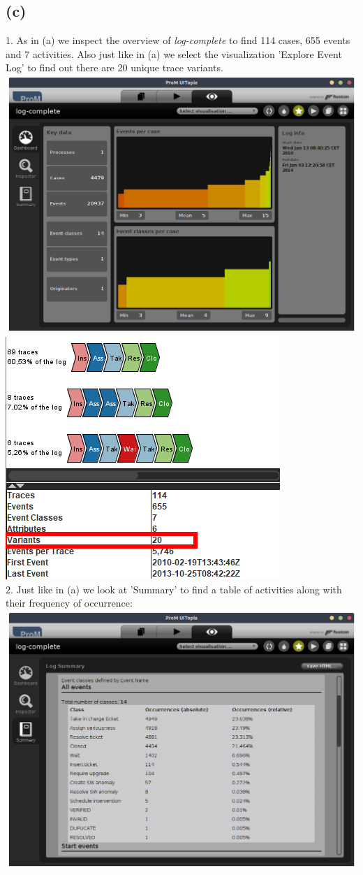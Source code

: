 \documentclass[../../main.tex]{subfiles}
\begin{document}
\subsection*{(c)}
1. As in (a) we inspect the overview of \textit{log-complete} to find 114 cases, 655 events and 7 activities. Also just like in (a) we select the visualization 'Explore Event Log' to find out there are 20 unique trace variants.\\
\includegraphics[width=0.6\columnwidth]{img/ProM_c_overview.png}
\includegraphics[width=0.4\columnwidth]{img/ProM_c_traces.png}\\
2. Just like in (a) we look at 'Summary' to find a table of activities along with their frequency of occurrence:\\
\includegraphics[width=0.8\columnwidth]{img/ProM_c_summary.png}\\
\end{document}
